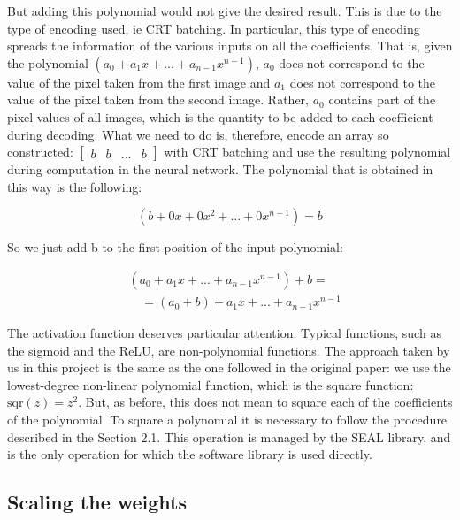 But adding this polynomial would not give the desired result. This is due to the type of encoding used, ie CRT batching. In particular, this type of encoding spreads the information of the various inputs on all the coefficients. That is, given the polynomial $(a_0 + a_1x + ... + a_{n-1}x^{n-1})$, $a_0$ does not correspond to the value of the pixel taken from the first image and $a_1$ does not correspond to the value of the pixel taken from the second image. Rather, $a_0$ contains part of the pixel values of all images, which is the quantity to be added to each coefficient during decoding. What we need to do is, therefore, encode an array so constructed: $\left[ \begin{matrix}b&b&...&b\end{matrix} \right]$ with CRT batching and use the resulting polynomial during computation in the neural network. The polynomial that is obtained in this way is the following:

\begin{equation*}
    (b+0x+0x^2+...+0x^{n-1})=b
\end{equation*}

So we just add b to the first position of the input polynomial:

\begin{align*}
    &(a_0+a_1x+...+a_{n-1}x^{n-1})+b =\\
    &\quad = (a_0+b)+a_1x+...+a_{n-1}x^{n-1}
\end{align*}

The activation function deserves particular attention. Typical functions, such as the sigmoid and the ReLU, are non-polynomial functions. The approach taken by us in this project is the same as the one followed in the original paper: we use the lowest-degree non-linear polynomial function, which is the square function: $\text{sqr}(z)=z^2$. But, as before, this does not mean to square each of the coefficients of the polynomial. To square a polynomial it is necessary to follow the procedure described in the Section 2.1. This operation is managed by the SEAL library, and is the only operation for which the software library is used directly.

\subsection{Scaling the weights}

